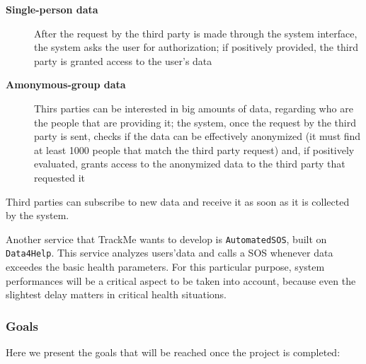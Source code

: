 \documentclass[12pt]{article}
\begin{document}
        \begin{description}
          \item [\textbf{Single-person data}] After the request by the third party is made through the system interface, the system asks the user for authorization; if positively provided, the third party is granted access to the user's data
          \item [\textbf{Amonymous-group data}] Thirs parties can be interested in big amounts of data, regarding who are the people that are providing it; the system, once the request by the third party is sent, checks if the data can be effectively anonymized (it must find at least 1000 people that match the third party request) and, if positively evaluated, grants access to the anonymized data to the third party that requested it
        \end{description}

        Third parties can subscribe to new data and receive it as soon as it is collected by the system.

        Another service that TrackMe wants to develop is \texttt{AutomatedSOS}, built on \texttt{Data4Help}. This service analyzes users'data and calls a SOS whenever data exceedes the basic health parameters. For this particular purpose, system performances will be a critical aspect to be taken into account, because even the slightest delay matters in critical health situations.

      \subsubsection{Goals}

        Here we present the goals that will be reached once the project is completed:

\end{document}
